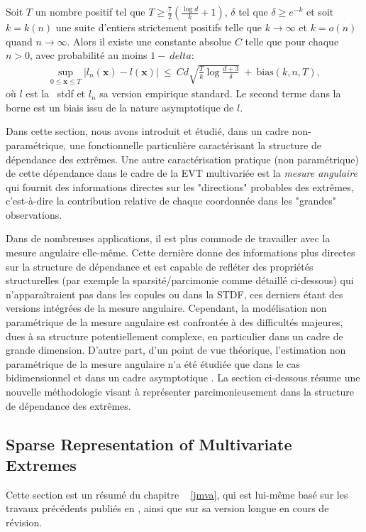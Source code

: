 \begin{theorem}
\label{resume_fr:thm:l}
Soit $T$ un nombre positif tel que $T \ge \frac{7}{2}(\frac{\log d}{k} + 1)$, $\delta$ tel que $\delta \ge e^{-k}$ et soit $k=k(n)$ une suite d'entiers strictement positifs telle que $k \to \infty$ et $k=o(n)$ quand $n \to \infty$. 
Alors il existe une constante absolue $ C $ telle que pour chaque $ n> 0 $, avec probabilité au moins $ 1- \ delta $:
\begin{align*}
\sup_{0 \le \mathbf{x} \le T} \left| l_n(\mathbf{x}) - l(\mathbf{x}) \right| ~\le~ Cd\sqrt{\frac{T}{k}\log\frac{d+3}{\delta}} ~+~
\text{bias}(k, n, T),
\end{align*}
où $ l $ est la \ stdf et $ l_n $ sa version empirique standard. Le second terme dans la borne est un biais issu de la nature asymptotique de $ l $.
\end{theorem}


Dans cette section, nous avons introduit et étudié, dans un cadre non-paramétrique, une fonctionnelle particulière caractérisant la structure de dépendance des extrêmes.
%
Une autre caractérisation pratique (non paramétrique) de cette dépendance dans le cadre de la EVT multivariée est la \textit{mesure angulaire} qui fournit des informations directes sur les "directions" probables des extrêmes, c'est-à-dire la contribution relative de chaque coordonnée dans les "grandes" observations.

Dans de nombreuses applications, il est plus commode de travailler avec la mesure angulaire elle-même. Cette dernière donne des informations plus directes sur la structure de dépendance et est capable de refléter des propriétés structurelles (par exemple la sparsité/parcimonie comme détaillé ci-dessous) qui n'apparaîtraient pas dans les copules ou dans la STDF, ces derniers étant des versions intégrées de la mesure angulaire.
Cependant, la modélisation non paramétrique de la mesure angulaire est confrontée à des difficultés majeures, dues à sa structure potentiellement complexe, en particulier dans un cadre de grande dimension.
D'autre part, d'un point de vue théorique, l'estimation non paramétrique de la mesure angulaire n'a été étudiée que dans le cas bidimensionnel et dans un cadre asymptotique \cite{Einmahl2001, Einmahl2009}. La section ci-dessous résume une nouvelle méthodologie visant à représenter parcimonieusement dans la structure de dépendance des extrêmes.


\subsection{Sparse Representation of Multivariate Extremes}
\label{resume_fr:sec:JMVA}
Cette section est un résumé du chapitre ~ \ref {jmva}, qui est lui-même basé sur les travaux précédents publiés en \cite {AISTAT16}, ainsi que sur sa version longue \cite {ARXIV16} en cours de révision.

